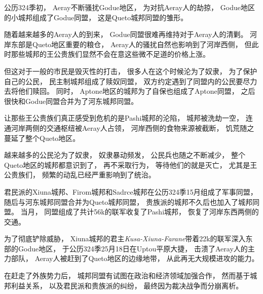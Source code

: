 \documentclass[UTF8,12pt,draft]{ctexbook}
\begin{document}
                公历324季初，
                Aeray不断骚扰Godue地区，
                为对抗Aeray人的劫掠，
                Godue地区的小城邦组成了Godue同盟，
                这是Queto城邦同盟的雏形。

                随着越来越多的Aeray人的到来，
                Godue同盟很难再维持对于Aeray人的清剿。
                河岸东部是Queto地区重要的粮仓，
                Aeray人的骚扰自然也影响到了河岸西侧，
                但此时那些城邦的王公贵族们显然不会在意这些微不足道的价格上涨。

                但这对于一般的市民是毁灭性的打击，
                很多人在这个时候沦为了奴隶，
                为了保护自己的公民，
                民主制城邦组成了赎奴同盟，
                双方约定遇到了同盟内的公民要尽力去将他们赎回。
                同时，
                Aptone地区的城邦为了自保也组成了Aptone同盟，
                之后很快和Godue同盟合并为了河东城邦同盟。

                让那些王公贵族们真正感受到危机的是Pashi城邦的沦陷，
                城邦被洗劫一空，
                连通河岸两侧的交通枢纽被Aeray人占领，
                河岸西侧的食物来源被截断，
                饥荒随之蔓延了整个Queto地区。

                越来越多的公民沦为了奴隶，
                奴隶暴动频发，
                公民兵也随之不断减少，
                整个Queto地区的城邦都意识到了，
                再不采取行为，
                等待他们的就是灭亡，
                尤其是王公贵族们，
                频繁的动乱已经严重影响到了统治。

                君民派的Xiuna城邦、Firom城邦和Sadrce城邦在公历324季15月组成了军事同盟，
                随后与河东城邦同盟合并为Queto城邦同盟，
                贵族派的城邦不久后也加入了城邦同盟。
                当月，
                同盟组成了共计56k的联军收复了Pashi城邦，
                恢复了河岸东西两侧的交通。

                为了彻底铲除威胁，
                Xiuna城邦的君主\emph{Kusa-Xiuna-Farane}带着22k的联军深入东部的Godue地区，
                于公历324季25月18日在Uptou平原大捷，
                击溃了Aeray人的主力部队，
                Aeray人被赶到了Queto地区的边缘地带，
                从此再无大规模进攻的能力。
                
                在赶走了外族势力后，
                城邦同盟有试图在政治和经济领域加强合作，
                然而基于城邦利益关系，
                以及君民派和贵族派的纠纷，
                最终因为裁决战争而分崩离析。
\end{document}
